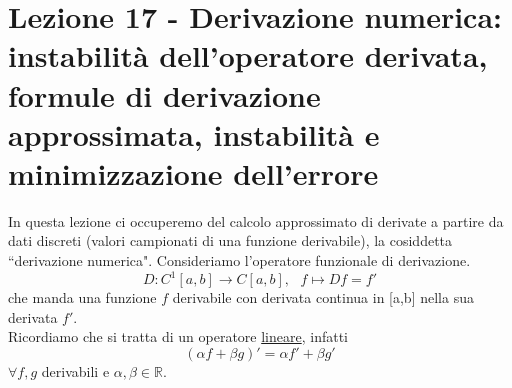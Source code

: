 \documentclass[12pt,a4paper]{article}
\begin{document}
\section[Lezione 17 - Derivazione numerica]{Lezione 17 - Derivazione numerica: instabilità dell'operatore derivata, formule di derivazione approssimata, instabilità e minimizzazione dell'errore}

In questa lezione ci occuperemo del calcolo approssimato di derivate a partire da dati discreti (valori campionati di una funzione derivabile), la cosiddetta ``derivazione numerica". Consideriamo l'operatore funzionale di derivazione.
\begin{equation*}
    D:C^1[a,b]\rightarrow C[a,b],\  \  \  f\longmapsto Df=f'
\end{equation*}
che manda una funzione $f$ derivabile con derivata continua in [a,b] nella sua derivata $f'$.\\ Ricordiamo che si tratta di un operatore \uline{lineare}, infatti 
\begin{equation*}
    (\alpha f+\beta g)'=\alpha f'+\beta g'
\end{equation*}
$\forall f,g$ derivabili e $\alpha,\beta\in\mathbb{R}$.
\end{document}
